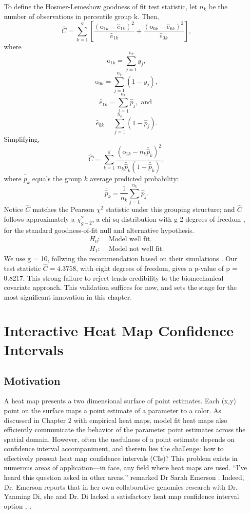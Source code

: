 To define the Hosmer-Lemeshow goodness of fit test statistic, let $n_{k}$ be the number of observations in percentile group k. Then,
$$ \widehat{C} = \sum_{k=1}^{g} \left[ \frac{(\text{o}_{1k}-\hat{e}_{1k})^{2}}{\hat{e}_{1k}} + \frac{(\text{o}_{0k}-\hat{e}_{0k})^{2}}{\hat{e}_{0k}}  \right], $$
where
$$ \text{o}_{1k} =  \sum_{j=1}^{n_{k}}y_{j},$$
$$ \text{o}_{0k} =  \sum_{j=1}^{n_{k}}(1-y_{j}),$$
$$ \hat{e}_{1k} = \sum_{j=1}^{n_{k}}\hat{p}_{j}, \text{ and }$$
$$ \hat{e}_{0k} = \sum_{j=1}^{n_{k}}(1-\hat{p}_{j}).$$
Simplifying, 
$$ \widehat{C} = \sum_{k=1}^{g} \frac{(\text{o}_{1k}-n_{k}\bar{\hat{p}}_{k})^{2}}{n_{k}\bar{\hat{p}}_{k}(1-\bar{\hat{p}}_{k})},$$
where $\bar{\hat{p}}_{k}$ equals the group $k$ average predicted probability:
$$\bar{\hat{p}}_{k} = \frac{1}{n_{k}}\sum_{j=1}^{n_{k}}\hat{p}_{j}.$$
Notice $\widehat{C}$ matches the Pearson $\chi^{2}$ statistic under this grouping structure; and $\widehat{C}$ follows approximately a $\chi^{2}_{g-2}$, a chi-sq distribution with g-2 degrees of freedom \citep{Hosmer1980}, for the standard goodness-of-fit null and alternative hypothesis.
\begin{align}
H_{0}: & \text{ Model well fit.} \\
H_{1}: & \text{ Model not well fit.}
\end{align}
We use g = 10, follwing the \cite{Hosmer2013} recommendation based on their simulations \cite{Hosmer1980}. Our test statistic $\widehat{C} = 4.3758$, with eight degrees of freedom, gives a p-value of p = 0.8217. This strong failure to reject lends credibility to the biomechanical covariate approach. This validation suffices for now, and sets the stage for the most significant innovation in this chapter.

\section{Interactive Heat Map Confidence Intervals}

\subsection{Motivation}

A heat map presents a two dimensional surface of point estimates. Each (x,y) point on the surface maps a point estimate of a parameter to a color. As discussed in Chapter 2 with empirical heat maps, model fit heat maps also efficiently communicate the behavior of the parameter point estimates across the spatial domain. However, often the usefulness of a point estimate depends on confidence interval accompaniment, and therein lies the challenge: how to effectively present heat map confidence intervals (CIs)? This problem exists in numerous areas of application---in face, any field where heat maps are used. ``I've heard this question asked in other areas,'' remarked Dr Sarah Emerson \citep{Emerson}. Indeed, Dr. Emerson reports that in her own collaborative genomics research with Dr. Yanming Di, she and Dr. Di lacked a satisfactory heat map confidence interval option \citep{Emerson}, \citep{Emerson2012}. 

